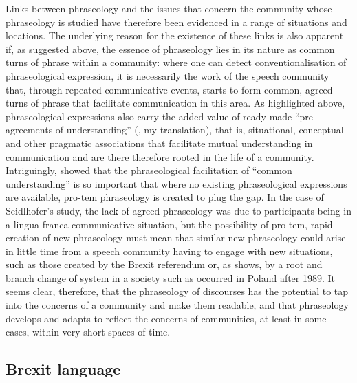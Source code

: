 \documentclass[output=paper]{langscibook}
\begin{document}
Links between phraseology and the issues that concern the community whose phraseology is studied have therefore been evidenced in a range of situations and locations. The underlying reason for the existence of these links is also apparent if, as suggested above, the essence of phraseology lies in its nature as common turns of phrase within a community: where one can detect conventionalisation of phraseological expression, it is necessarily the work of the speech community that, through repeated communicative events, starts to form common, agreed turns of phrase that facilitate communication in this area. As highlighted above, phraseological expressions also carry the added value of ready-made “pre-agreements of understanding” (\citealt[367]{Feilke1994}, my translation), that is, situational, conceptual and other pragmatic associations that facilitate mutual understanding in communication and are there therefore rooted in the life of a community. Intriguingly, \citet[205]{Seidlhofer2009} showed that the phraseological facilitation of ``common understanding'' is so important that where no existing phraseological expressions are available, pro-tem phraseology is created to plug the gap. In the case of Seidlhofer’s study, the lack of agreed phraseology was due to participants being in a lingua franca communicative situation, but the possibility of pro-tem, rapid creation of new phraseology must mean that similar new phraseology could arise in little time from a speech community having to engage with new situations, such as those created by the Brexit referendum or, as \citet{Szerszunowicz2015} shows, by a root and branch change of system in a society such as occurred in Poland after 1989. It seems clear, therefore, that the phraseology of discourses has the potential to tap into the concerns of a community and make them readable, and that phraseology develops and adapts to reflect the concerns of communities, at least in some cases, within very short spaces of time.

\subsection{Brexit language}
\end{document}
